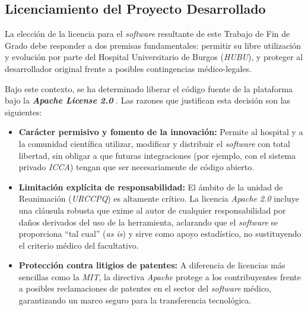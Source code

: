 \subsection{Licenciamiento del Proyecto Desarrollado}

La elección de la licencia para el \textit{software} resultante de este Trabajo de Fin de Grado debe responder a dos premisas fundamentales: permitir su libre utilización y evolución por parte del Hospital Universitario de Burgos (\textit{HUBU}), y proteger al desarrollador original frente a posibles contingencias médico-legales.

Bajo este contexto, se ha determinado liberar el código fuente de la plataforma bajo la \textbf{\textit{Apache License 2.0}} \cite{apache}. Las razones que justifican esta decisión son las siguientes:

\begin{itemize}
    \item \textbf{Carácter permisivo y fomento de la innovación:} Permite al hospital y a la comunidad científica utilizar, modificar y distribuir el \textit{software} con total libertad, sin obligar a que futuras integraciones (por ejemplo, con el sistema privado \textit{ICCA}) tengan que ser necesariamente de código abierto.
    \item \textbf{Limitación explícita de responsabilidad:} El ámbito de la unidad de Reanimación (\textit{URCCPQ}) es altamente crítico. La licencia \textit{Apache 2.0} incluye una cláusula robusta que exime al autor de cualquier responsabilidad por daños derivados del uso de la herramienta, aclarando que el \textit{software} se proporciona ``tal cual'' (\textit{as is}) y sirve como apoyo estadístico, no sustituyendo el criterio médico del facultativo.
    \item \textbf{Protección contra litigios de patentes:} A diferencia de licencias más sencillas como la \textit{MIT}, la directiva \textit{Apache} protege a los contribuyentes frente a posibles reclamaciones de patentes en el sector del \textit{software} médico, garantizando un marco seguro para la transferencia tecnológica.
\end{itemize}
